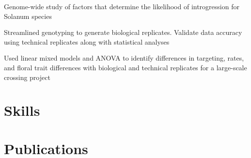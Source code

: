 \documentclass[11pt, a4paper]{awesome-cv}
\begin{document}
\begin{cventries}
{\begin{cvitems}
\item Genome-wide study of factors that determine the likelihood of introgression for Solanum species
\item Streamlined genotyping to generate biological replicates. Validate data accuracy using technical replicates along with statistical analyses
\item Used linear mixed models and ANOVA to identify differences in targeting, rates, and floral trait differences with biological and technical replicates for a large-scale crossing project
\end{cvitems}}
\end{cventries}

\hypertarget{skills}{%
\section{Skills}\label{skills}}

\begin{cventries}
    \vspace{-4.0mm}
    \vspace{-4.0mm}
\end{cventries}

\hypertarget{publications}{%
\section{Publications}\label{publications}}
\end{document}
